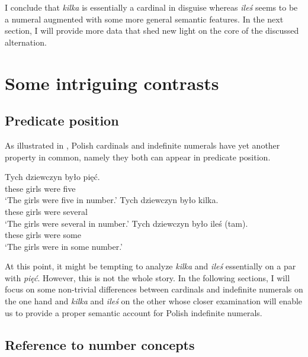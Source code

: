 \documentclass[output=paper,
]{langscibook}
\begin{document}
	I conclude that \textit{kilka} is essentially a cardinal in disguise whereas \textit{ileś} seems to be a numeral augmented with some more general semantic features. In the next section, I will provide more data that shed new light on the core of the discussed alternation.
	
	\section{Some intriguing contrasts}\label{sec:some-intriguing-contrasts}
	
	\subsection{Predicate position}\label{sec:predicate-position}
	
	 As illustrated in , Polish cardinals and indefinite numerals have yet another property in common, namely they both can appear in predicate position.
	
	\ea \label{ex:predicate-position} \ea \gll Tych dziewczyn było pięć.\\
	these girls were five\\
	\glt `The girls were five in number.'
	\ex \gll Tych dziewczyn było kilka.\\
	these girls were several\\
	\glt `The girls were several in number.'
	\ex \gll Tych dziewczyn było {ileś (tam)}.\\
	these girls were some\\
	\glt `The girls were in some number.'
	\z
    \z

	\noindent At this point, it might be tempting to analyze \textit{kilka} and \textit{ileś} essentially on a par with \textit{pięć}. However, this is not the whole story. In the following sections, I will focus on some non-trivial differences between cardinals and indefinite numerals on the one hand and \textit{kilka} and \textit{ileś} on the other whose closer examination will enable us to provide a proper semantic account for Polish indefinite numerals. 
	
	\subsection{Reference to number concepts}\label{sec:reference-to-number-concepts}
	
\end{document}

